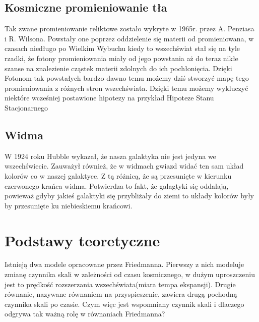 \documentclass[12pt]{article}
\begin{document}
	\subsection{Kosmiczne promieniowanie tła}
	Tak zwane promieniowanie reliktowe zostało wykryte w 1965r. przez A. Penziasa i R. Wilsona. Powstały one poprzez oddzielenie się materii od promieniowana, w czasach niedługo po Wielkim Wybuchu kiedy to wszechświat stał się na tyle rzadki, że fotony promieniowania miały od jego powstania aż do teraz nikłe szanse na znalezienie cząstek materii zdolnych do ich pochłonięcia. Dzięki Fotonom tak powstałych bardzo dawno temu możemy dziś stworzyć mapę tego promieniowania z różnych stron wszechświata.	Dzięki temu możemy wykluczyć niektóre wcześniej postawione hipotezy na przykład Hipoteze Stanu Stacjonarnego
	\subsection{Widma}
	W 1924 roku Hubble  wykazał, że nasza galaktyka nie jest jedyna we wszechświecie. Zauważył również, że w widmach gwiazd widać ten sam układ kolorów co w naszej galaktyce. Z tą różnicą, że są przesunięte w kierunku czerwonego krańca widma. Potwierdza to fakt, że galagtyki się oddalają, powieważ gdyby jakieś galaktyki się przybliżały do ziemi to układy kolorów były by przesunięte ku niebieskiemu krańcowi. 
	\section{Podstawy teoretyczne}
	Istnieją dwa modele opracowane przez Friedmanna. Pierwszy z nich modeluje zmianę czynnika skali w zależności od czasu kosmicznego, w dużym uproszczeniu jest to prędkość rozszerzania wszechświata(miara tempa ekspansji). Drugie równanie, nazywane równaniem na przyspieszenie, zawiera drugą pochodną czynnika skali po czasie. Czym więc jest wspomniany czynnik skali i dlaczego odgrywa tak ważną rolę w równaniach Friedmanna?
\end{document}
